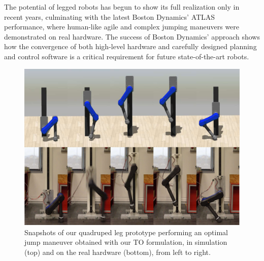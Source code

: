 The potential of legged robots has begun to show its full realization only in recent years, culminating with the latest Boston Dynamics' ATLAS~\cite{agile_bots::atlas_gets_grip} performance, where human-like agile and complex jumping maneuvers were demonstrated on real hardware. The success of Boston Dynamics' approach shows how the convergence of both high-level hardware and carefully designed planning and control software is a critical requirement for future state-of-the-art robots. 
\begin{figure}[t]
    \centering
    \includegraphics[width=0.9\columnwidth]{images/jumping_sequence_real_sim_compressed.pdf}
    \caption{Snapshots of our quadruped leg prototype performing an optimal jump maneuver obtained with our TO formulation, in simulation (top) and on the real hardware (bottom), from left to right.}
    \label{fig:jumping_sequence}
\end{figure}

